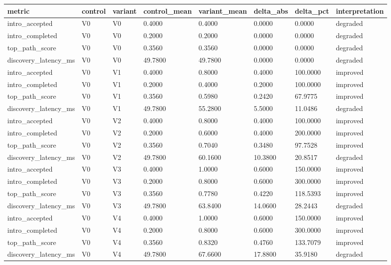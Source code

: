 \begin{tabular}{llllllll}
\toprule
metric & control & variant & control_mean & variant_mean & delta_abs & delta_pct & interpretation \\
\midrule
intro_accepted & V0 & V0 & 0.4000 & 0.4000 & 0.0000 & 0.0000 & degraded \\
intro_completed & V0 & V0 & 0.2000 & 0.2000 & 0.0000 & 0.0000 & degraded \\
top_path_score & V0 & V0 & 0.3560 & 0.3560 & 0.0000 & 0.0000 & degraded \\
discovery_latency_ms & V0 & V0 & 49.7800 & 49.7800 & 0.0000 & 0.0000 & degraded \\
intro_accepted & V0 & V1 & 0.4000 & 0.8000 & 0.4000 & 100.0000 & improved \\
intro_completed & V0 & V1 & 0.2000 & 0.4000 & 0.2000 & 100.0000 & improved \\
top_path_score & V0 & V1 & 0.3560 & 0.5980 & 0.2420 & 67.9775 & improved \\
discovery_latency_ms & V0 & V1 & 49.7800 & 55.2800 & 5.5000 & 11.0486 & degraded \\
intro_accepted & V0 & V2 & 0.4000 & 0.8000 & 0.4000 & 100.0000 & improved \\
intro_completed & V0 & V2 & 0.2000 & 0.6000 & 0.4000 & 200.0000 & improved \\
top_path_score & V0 & V2 & 0.3560 & 0.7040 & 0.3480 & 97.7528 & improved \\
discovery_latency_ms & V0 & V2 & 49.7800 & 60.1600 & 10.3800 & 20.8517 & degraded \\
intro_accepted & V0 & V3 & 0.4000 & 1.0000 & 0.6000 & 150.0000 & improved \\
intro_completed & V0 & V3 & 0.2000 & 0.8000 & 0.6000 & 300.0000 & improved \\
top_path_score & V0 & V3 & 0.3560 & 0.7780 & 0.4220 & 118.5393 & improved \\
discovery_latency_ms & V0 & V3 & 49.7800 & 63.8400 & 14.0600 & 28.2443 & degraded \\
intro_accepted & V0 & V4 & 0.4000 & 1.0000 & 0.6000 & 150.0000 & improved \\
intro_completed & V0 & V4 & 0.2000 & 0.8000 & 0.6000 & 300.0000 & improved \\
top_path_score & V0 & V4 & 0.3560 & 0.8320 & 0.4760 & 133.7079 & improved \\
discovery_latency_ms & V0 & V4 & 49.7800 & 67.6600 & 17.8800 & 35.9180 & degraded \\
\bottomrule
\end{tabular}
